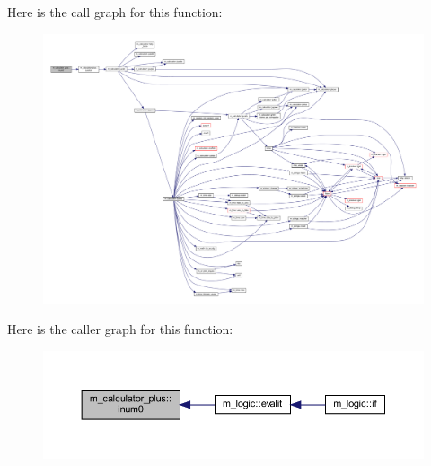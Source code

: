 Here is the call graph for this function\+:
\nopagebreak
\begin{figure}[H]
\begin{center}
\leavevmode
\includegraphics[width=350pt]{namespacem__calculator__plus_a3edbf94f311a3fad4a83fd8dfe26a61a_cgraph}
\end{center}
\end{figure}
Here is the caller graph for this function\+:
\nopagebreak
\begin{figure}[H]
\begin{center}
\leavevmode
\includegraphics[width=350pt]{namespacem__calculator__plus_a3edbf94f311a3fad4a83fd8dfe26a61a_icgraph}
\end{center}
\end{figure}
\mbox{\label{namespacem__calculator__plus_ac6f5a1bd3d8be798af932c006a72b123}} 
